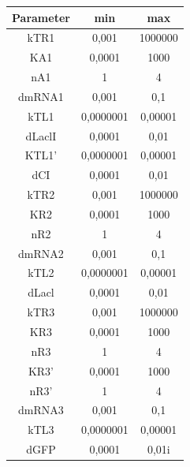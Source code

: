 \documentclass{article}
\begin{document}
      \begin{small} 
        \begin{tabular}{ | c |c | c |}
          \hline                       
            Parameter & min & max \\ \hline                       
            kTR1 &            0,001           &    1000000   \\ \hline    
            KA1 &             0,0001          &    1000 \\ \hline  
            nA1 &             1               &    4 \\ \hline
            dmRNA1 &          0,001           &    0,1 \\ \hline
            kTL1 &            0,0000001       &    0,00001 \\ \hline
            dLaclI &          0,0001          &    0,01 \\ \hline
            KTL1' &           0,0000001       &    0,00001 \\ \hline
            dCI &             0,0001          &    0,01 \\ \hline
            kTR2 &            0,001           &    1000000 \\ \hline
            KR2 &             0,0001          &    1000 \\ \hline
            nR2 &             1               &    4 \\ \hline
            dmRNA2 &          0,001           &    0,1 \\ \hline
            kTL2 &            0,0000001       &    0,00001 \\ \hline
            dLacl &           0,0001          &    0,01 \\ \hline
            kTR3 &            0,001           &    1000000 \\ \hline
            KR3 &             0,0001          &    1000 \\ \hline
            nR3 &             1               &    4 \\ \hline
            KR3' &            0,0001          &    1000 \\ \hline
            nR3' &            1               &    4 \\ \hline
            dmRNA3 &          0,001           &    0,1 \\ \hline
            kTL3 &            0,0000001       &    0,00001 \\ \hline
            dGFP &            0,0001          &    0,01i   \\ 
            \hline  
        \end{tabular}
      \end{small}
\end{document}
